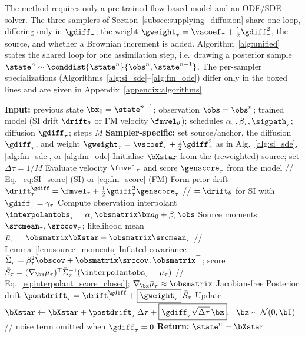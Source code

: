 
The method requires only a pre-trained flow-based model and an ODE/SDE solver. The three samplers of Section~\ref{subsec:supplying_diffusion} share one loop, differing only in $\gdiff_\tau$, the weight $\gweight_\tau=\vscoef_\tau+\tfrac12\gdiff_\tau^2$, the source, and whether a Brownian increment is added. Algorithm~\ref{alg:unified} states the shared loop for one assimilation step, i.e.\ drawing a posterior sample $\state^{n}\sim\conddist{\state^{n}}{\obs^{n},\state^{n-1}}$. The per-sampler specializations (Algorithms~\ref{alg:si_sde}--\ref{alg:fm_ode}) differ only in the boxed lines and are given in Appendix~\ref{appendix:algorithms}.

\begin{algorithm}[ht]
\caption{Unified posterior assimilation step (shared loop for all three samplers)}
\label{alg:unified}
\begin{algorithmic}[1]
\STATE \textbf{Input:} previous state $\bx_0=\state^{n-1}$; observation $\obs=\obs^{n}$; trained model (SI drift $\drift_\theta$ or FM velocity $\fmvel_\theta$); schedules $\alpha_\tau,\beta_\tau,\sigpath_\tau$; diffusion $\gdiff_\tau$; steps $M$
\STATE \textbf{Sampler-specific:} set source/anchor, the diffusion $\gdiff_\tau$, and weight $\gweight_\tau=\vscoef_\tau+\tfrac12\gdiff_\tau^2$ as in Alg.~\ref{alg:si_sde}, \ref{alg:fm_sde}, or \ref{alg:fm_ode}
\STATE Initialise $\bXstar$ from the (reweighted) source; set $\Delta\tau = 1/M$
    \STATE Evaluate velocity $\fmvel_\tau$ and score $\genscore_\tau$ from the model \hfill // Eq.~\eqref{eq:SI_score} (SI) or \eqref{eq:fm_score} (FM)
    \STATE Form prior drift $\drift^{\gdiff}_\tau = \fmvel_\tau + \tfrac12\gdiff_\tau^2\genscore_\tau$ \hfill // $=\drift_\theta$ for SI with $\gdiff_\tau=\gamma_\tau$
    \STATE Compute observation interpolant $\interpolantobs_\tau = \alpha_\tau\obsmatrix\bm a_0 + \beta_\tau\obs$
    \STATE Source moments $\srcmean_\tau,\srccov_\tau$; likelihood mean $\bar\mu_\tau=\obsmatrix\bXstar-\obsmatrix\srcmean_\tau$ \hfill // Lemma~\ref{lem:source_moments}
    \STATE Inflated covariance $\bar\Sigma_\tau=\beta_\tau^2\obscov+\obsmatrix\srccov_\tau\obsmatrix^\top$; score $\bar S_\tau = (\nabla_{\bx}\bar\mu_\tau)^\top\bar\Sigma_\tau^{-1}(\interpolantobs_\tau-\bar\mu_\tau)$ \hfill // Eq.~\eqref{eq:interpolant_score_closed}; $\nabla_{\bx}\bar\mu_\tau\approx\obsmatrix$ Jacobian-free
    \STATE Posterior drift $\postdrift_\tau = \drift^{\gdiff}_\tau + \boxed{\gweight_\tau}\, \bar S_\tau$
    \STATE Update $\bXstar \leftarrow \bXstar + \postdrift_\tau\,\Delta\tau + \boxed{\gdiff_\tau\sqrt{\Delta\tau}\,\bz},\ \ \bz\sim\mathcal{N}(0,\bI)$ \hfill // noise term omitted when $\gdiff_\tau=0$
\ENDFOR
\STATE \textbf{Return:} $\state^{n} = \bXstar$
\end{algorithmic}
\end{algorithm}

